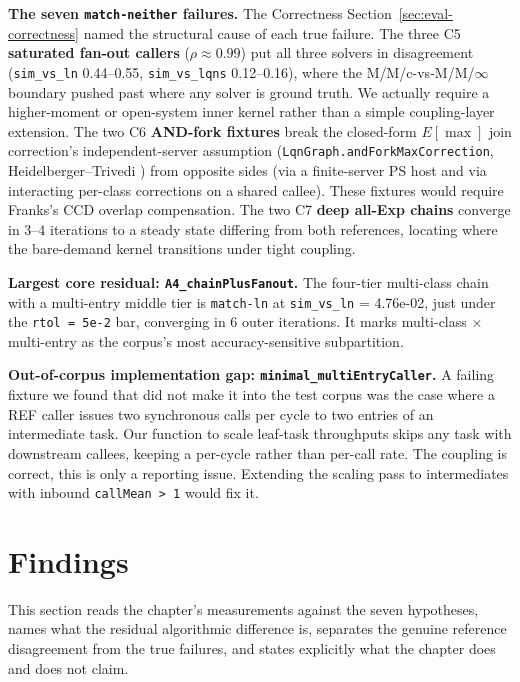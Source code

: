 \textbf{The seven \texttt{match-neither} failures.} The Correctness Section~\ref{sec:eval-correctness} named the structural cause of each true failure. The three C5 \textbf{saturated fan-out callers} ($\rho \approx 0.99$) put all three solvers in disagreement (\texttt{sim\_vs\_ln} 0.44--0.55, \texttt{sim\_vs\_lqns} 0.12--0.16), where the M/M/c-vs-M/M/$\infty$ boundary pushed past where any solver is ground truth. We actually require a higher-moment or open-system inner kernel rather than a simple coupling-layer extension. The two C6 \textbf{AND-fork fixtures} break the closed-form $E[\max]$ join correction's independent-server assumption (\texttt{LqnGraph.andForkMaxCorrection}, Heidelberger--Trivedi \cite{heidelberger83}) from opposite sides (via a finite-server PS host and via interacting per-class corrections on a shared callee). These fixtures would require Franks's CCD overlap compensation. The two C7 \textbf{deep all-Exp chains} converge in 3--4 iterations to a steady state differing from both references, locating where the bare-demand kernel transitions under tight coupling.

\textbf{Largest core residual: \texttt{A4\_chainPlusFanout}.} The four-tier multi-class chain with a multi-entry middle tier is \texttt{match-ln} at \texttt{sim\_vs\_ln} = 4.76e-02, just under the \texttt{rtol = 5e-2} bar, converging in 6 outer iterations. It marks multi-class $\times$ multi-entry as the corpus's most accuracy-sensitive subpartition.

\textbf{Out-of-corpus implementation gap: \texttt{minimal\_multiEntryCaller}.} A failing fixture we found that did not make it into the test corpus was the case where a REF caller issues two synchronous calls per cycle to two entries of an intermediate task. Our function to scale leaf-task throughputs skips any task with downstream callees, keeping a per-cycle rather than per-call rate. The coupling is correct, this is only a reporting issue. Extending the scaling pass to intermediates with inbound \texttt{callMean > 1} would fix it.







\section{Findings}
\label{sec:eval-discussion}

This section reads the chapter's measurements against the seven hypotheses, names what the residual algorithmic difference is, separates the genuine reference disagreement from the true failures, and states explicitly what the chapter does and does not claim.

